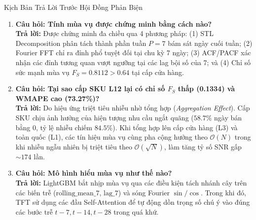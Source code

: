 \documentclass[12pt,a4paper,oneside]{article}
\begin{document}
\begin{defensebox}{Kịch Bản Trả Lời Trước Hội Đồng Phản Biện}
    \begin{enumerate}
        \item \textbf{Câu hỏi: Tính mùa vụ được chứng minh bằng cách nào?}
        \\ \textbf{Trả lời:} Được chứng minh đa chiều qua 4 phương pháp: (1) STL Decomposition phân tách thành phần tuần $P=7$ bám sát ngày cuối tuần; (2) Fourier FFT chỉ ra đỉnh phổ tuyệt đối tại chu kỳ 7 ngày; (3) ACF/PACF xác nhận các đỉnh tương quan vượt ngưỡng tại các lag bội số của 7; và (4) Chỉ số sức mạnh mùa vụ $F_S = 0.8112 > 0.64$ tại cấp cửa hàng.
        \item \textbf{Câu hỏi: Tại sao cấp SKU L12 lại có chỉ số $F_S$ thấp (0.1334) và WMAPE cao (73.27\%)?}
        \\ \textbf{Trả lời:} Do hiệu ứng triệt tiêu nhiễu nhờ tổng hợp (\textit{Aggregation Effect}). Cấp SKU chịu ảnh hưởng của hiện tượng nhu cầu ngắt quãng ($58.7\%$ ngày bán bằng 0, tỷ lệ nhiễu chiếm $84.5\%$). Khi tổng hợp lên cấp cửa hàng (L3) và toàn quốc (L1), các tín hiệu mùa vụ cùng pha cộng hưởng theo $\mathcal{O}(N)$ trong khi nhiễu ngẫu nhiên bị triệt tiêu theo $\mathcal{O}(\sqrt{N})$, làm tăng tỷ số SNR gấp $\sim 174$ lần.
        \item \textbf{Câu hỏi: Mô hình hiểu mùa vụ như thế nào?}
        \\ \textbf{Trả lời:} LightGBM bắt nhịp mùa vụ qua các điều kiện tách nhánh cây trên các biến trễ ($\mathrm{rolling\_mean\_7}$, $\mathrm{lag\_7}$) và sóng Fourier $\sin/\cos$. Trong khi đó, TFT sử dụng các đầu Self-Attention để tự động dồn trọng số chú ý vào đúng các bước trễ $t-7, t-14, t-28$ trong quá khứ.
    \end{enumerate}
\end{defensebox}
\end{document}
